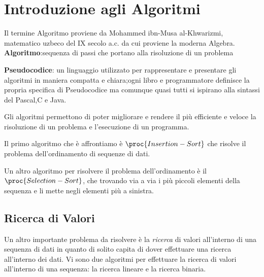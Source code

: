 \chapter{Introduzione agli Algoritmi}
Il termine Algoritmo proviene da Mohammed ibn-Musa al-Khwarizmi, matematico uzbeco
del IX secolo a.c. da cui proviene la moderna Algebra. \newline
\textbf{Algoritmo}:sequenza di passi che portano alla risoluzione di un problema

\textbf{Pseudocodice}: un linguaggio utilizzato per rappresentare e presentare gli algoritmi
 in maniera compatta e chiara;ogni libro e programmatore definisce la propria specifica
di Pseudocodice ma comunque quasi tutti si ispirano alla sintassi del Pascal,C e Java.

Gli algoritmi permettono di poter migliorare e rendere il più efficiente e veloce
la risoluzione di un problema e l'esecuzione di un programma.

Il primo algoritmo che è affrontiamo è $\proc{Insertion-Sort}$ che risolve il problema
dell'ordinamento di sequenze di dati.

Un altro algoritmo per risolvere il problema dell'ordinamento è il $\proc{Selection-Sort}$,
che trovando via a via i più piccoli elementi della sequenza e li mette negli elementi più a sinistra.

\section{Ricerca di Valori}
Un altro importante problema da risolvere è la \emph{ricerca} di valori all'interno
di una sequenza di dati in quanto di solito capita di dover effettuare una ricerca all'interno dei dati.
Vi sono due algoritmi per effettuare la ricerca di valori all'interno di una sequenza:
la ricerca lineare e la ricerca binaria.



